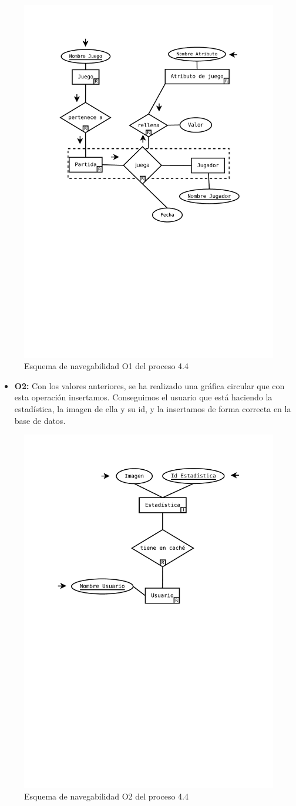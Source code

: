 \begin{figure}[H]
	\centering
	\includegraphics[width=0.5\linewidth]{../Diagramas/pdf/OpEstadisticas3.pdf}
	\caption{Esquema de navegabilidad  O1 del proceso 4.4}
	
	\label{fig:O4.4}
\end{figure}
\begin{itemize}
	\item \textbf{O2:} Con los valores anteriores, se ha realizado una gráfica circular que con esta operación insertamos. Conseguimos el usuario que está haciendo la estadística, la imagen de ella y su id, y la insertamos de forma correcta en la base de datos.
\end{itemize}

\begin{figure}[H]
	\centering
	\includegraphics[width=0.5\linewidth]{../Diagramas/pdf/OpEstadisticas1-2.pdf}
	\caption{Esquema de navegabilidad  O2 del proceso 4.4}
	
	\label{fig:O4.42}
\end{figure}


